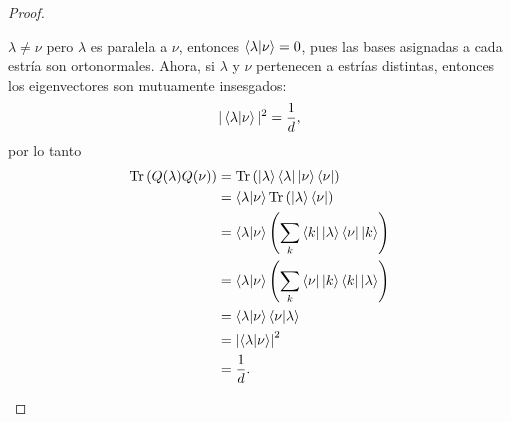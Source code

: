 \documentclass[a4paper,11pt]{report}
\DeclareMathOperator{\Tr}{Tr}
\begin{document}
\begin{proof}
\begin{enumerate}
        $\lambda \neq \nu$ pero $\lambda$ es paralela a
        $\nu$, entonces $\braket{\lambda|\nu} = 0$, pues las
        bases asignadas a cada estría son ortonormales.
        Ahora, si $\lambda$ y  $\nu$ pertenecen a estrías
        distintas, entonces los eigenvectores son mutuamente
        insesgados:
        \begin{equation}
          |\braket{\lambda|\nu}|^2
          = \frac{1}{d},
        \end{equation}
        por lo tanto
        \begin{align}
          \Tr\left( Q(\lambda)Q(\nu) \right) 
          &= \Tr\left( \ket{\lambda}\bra{\lambda}
            \ket{\nu}\bra{\nu} \right) \\
          &= \braket{\lambda|\nu} \Tr\left(
            \ket\lambda \bra\nu
          \right) \\
          &= \braket{\lambda|\nu} \left(
            \sum_{k}^{} \bra k \ket
          \lambda \bra \nu \ket k \right) \\
          &= \braket{\lambda|\nu} \left(
            \sum_{k}^{} \bra\nu \ket k
          \bra k \ket \lambda \right) \\
          &= \braket{\lambda|\nu} \braket{\nu|\lambda} \\
          &= \left|\braket{\lambda|\nu}\right|^2 \\
          &= \frac{1}{d}.
        \end{align}


\end{enumerate}
\end{proof}
\end{document}
